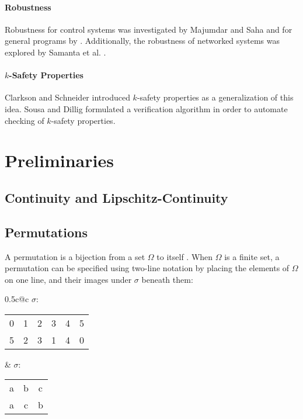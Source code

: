 \documentclass{llncs}
\begin{document}
\paragraph{Robustness} Robustness for control systems was investigated by Majumdar and Saha \cite{majumdar09} and for general programs by \cite{chaudhuri11}.  Additionally, the robustness of networked systems was explored by Samanta et al. \cite{samanta13a}.

\paragraph{\(k\)-Safety Properties} Clarkson and Schneider \cite{clarkson08} introduced \(k\)-safety properties as a generalization of this idea.  Sousa and Dillig \cite{sousa16} formulated a verification algorithm in order to automate checking of \(k\)-safety properties.

\section{Preliminaries}

\subsection{Continuity and Lipschitz-Continuity}


\subsection{Permutations}
\label{perms}

A permutation is a bijection from a set \(\Omega\) to itself \cite{dummitfoote}.  When \(\Omega\) is a finite set, a permutation can be specified using two-line notation by placing the elements of \(\Omega\) on one line, and their images under \(\sigma\) beneath them:

\begin{center}
\begin{tabular*}{0.5\textwidth}{c@{\extracolsep{\fill}}c}
\(\sigma\):
\begin{tabular}{cccccc}
0 & 1 & 2 & 3 & 4 & 5\\
5 & 2 & 3 & 1 & 4 & 0
\end{tabular}
&
\(\sigma\):
\begin{tabular}{ccc}
a & b & c\\
a & c & b
\end{tabular}
\end{tabular*}
\end{center}
\end{document}
